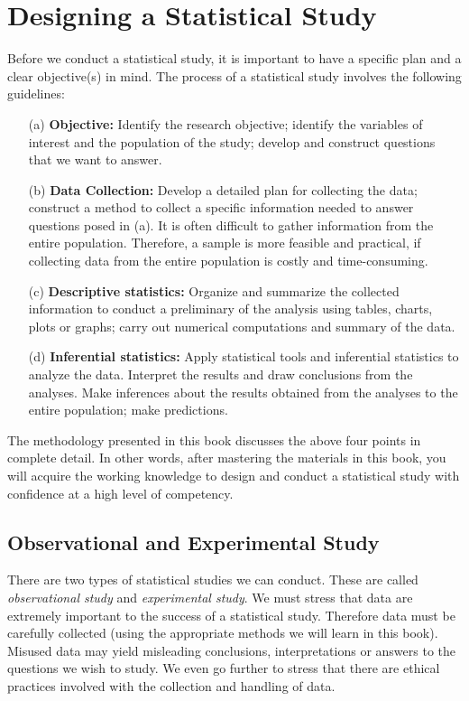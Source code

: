 \section{Designing a Statistical Study}

Before we conduct a statistical study, it is important to have a specific plan and a clear objective(s) in mind. The process of a statistical study involves the following guidelines:

\begin{itemize}
   \item[(a)] {\bf{Objective:}} Identify the research objective; identify the variables of interest and the population of the study; develop and construct questions that we want to answer. 
   \item[(b)] {\bf{Data Collection:}} Develop a detailed plan for collecting the data; construct a method to collect a specific information needed to answer questions posed in (a). It is often difficult to gather information from the entire population. Therefore, a sample is more feasible and practical, if collecting data from the entire population is costly and time-consuming.   
   \item[(c)] {\bf{Descriptive statistics:}} Organize and summarize the collected information to conduct a preliminary of the analysis using tables, charts, plots or graphs; carry out numerical computations and summary of the data.   
   \item[(d)] {\bf{Inferential statistics:}} Apply statistical tools and inferential statistics to analyze the data. Interpret the results and draw conclusions from the analyses. Make inferences about the results obtained from the analyses to the entire population; make predictions. 
\end{itemize}
 
The methodology presented in this book discusses the above four points in complete detail. In other words, after mastering the materials in this book, you will acquire the working knowledge to design and conduct a statistical study with confidence at a high level of competency.     

\subsection{Observational and Experimental Study}

There are two types of statistical studies we can conduct. These are called {\it{observational study}} and {\it{experimental study}}. We must stress that data are extremely important to the success of a statistical study. Therefore data must be carefully collected (using the appropriate methods we will learn in this book). Misused data may yield misleading conclusions, interpretations or answers to the questions we wish to study. We even go further to stress that there are ethical practices involved with the collection and handling of data.   

